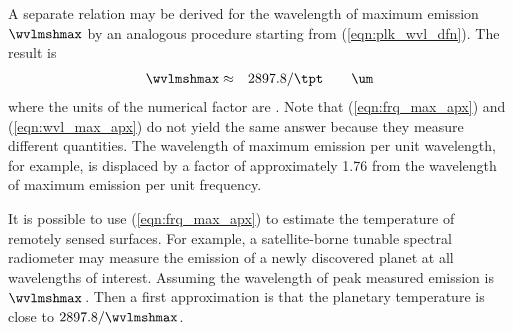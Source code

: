 \documentclass[12pt]{article}
\begin{document}
A separate relation may be derived for the wavelength of maximum
emission $\wvlmshmax$ by an analogous procedure starting from
(\ref{eqn:plk_wvl_dfn}). 
The result is
\begin{eqnarray}
\wvlmshmax & \approx & 2897.8 / \tpt \qquad\mbox{\um}
\label{eqn:wvl_max_apx}
\end{eqnarray}
where the units of the numerical factor are \umk.
Note that (\ref{eqn:frq_max_apx}) and (\ref{eqn:wvl_max_apx})
do not yield the same answer because they measure different 
quantities.
The wavelength of maximum emission per unit wavelength, for example,
is displaced by a factor of approximately 1.76 from the wavelength of
maximum emission per unit frequency.

It is possible to use (\ref{eqn:frq_max_apx}) to estimate the
temperature of remotely sensed surfaces.
For example, a satellite-borne tunable spectral radiometer may measure
the emission of a newly discovered planet at all wavelengths of
interest.  
Assuming the wavelength of peak measured emission is $\wvlmshmax$\,\um.
Then a first approximation is that the planetary temperature is close
to $2897.8 / \wvlmshmax$.
\end{document}
